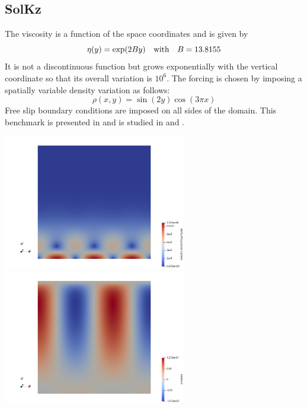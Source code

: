 \documentclass[a4paper]{article}
\begin{document}
\subsection{SolKz}

The viscosity is a function of the space coordinates and is given by  
\[
\eta(y)=\exp(2By) \quad {\rm with} \quad B=13.8155
\]
It is not a discontinuous function but grows exponentially with the 
vertical coordinate so that its overall variation is $10^6$. 
The forcing is chosen by imposing a spatially variable density variation as follows:
\[
\rho(x,y)=\sin(2y) \cos(3\pi x)
\]
Free slip boundary conditions are imposed on all sides of the domain.
This benchmark is presented in \cite{zhon96} and is studied in \cite{dumg11} 
and \cite{gemd13}.

\begin{center}
\includegraphics[width=8cm]{./results/benchmark_solkz/vel}
\includegraphics[width=8cm]{./results/benchmark_solkz/press}
\end{center}
\end{document}
